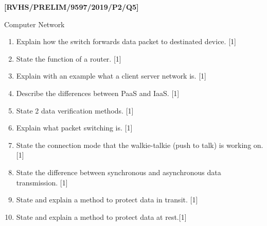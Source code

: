 \item \textbf{{[}RVHS/PRELIM/9597/2019/P2/Q5{]} }

Computer Network
\begin{enumerate}
\item Explain how the switch forwards data packet to destinated device.
\hfill{}{[}1{]}
\item State the function of a router.\hfill{} {[}1{]}
\item Explain with an example what a client server network is.\hfill{}
{[}1{]}
\item Describe the differences between PaaS and IaaS.\hfill{} {[}1{]}
\item State 2 data verification methods.\hfill{} {[}1{]}
\item Explain what packet switching is.\hfill{} {[}1{]}
\item State the connection mode that the walkie-talkie (push to talk) is
working on.\hfill{} {[}1{]}
\item State the difference between synchronous and asynchronous data transmission.
\hfill{}{[}1{]}
\item State and explain a method to protect data in transit.\hfill{} {[}1{]}
\item State and explain a method to protect data at rest.\hfill{}{[}1{]}
\end{enumerate}